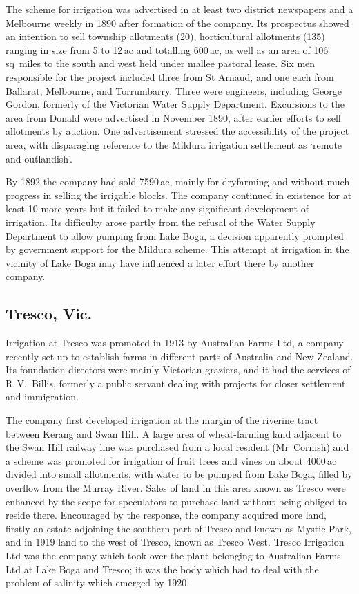 The scheme for irrigation was advertised in at least two district
newspapers and a Melbourne weekly in 1890 after formation of the
company.  Its prospectus showed an intention to sell township
allotments (20), horticultural allotments (135) ranging in size from 5
to 12\,ac and totalling 600\,ac, as well as an area of 106\,sq~miles
to the south and west held under mallee pastoral lease. Six men
responsible for the project included three from St Arnaud, and one
each from Ballarat, Melbourne, and Torrumbarry.  Three were engineers,
including George Gordon, formerly of the Victorian Water Supply
Department.  Excursions to the area from Donald were advertised in
November 1890, after earlier efforts to sell allotments by auction.
One advertisement stressed the accessibility of the project area, with
disparaging reference to the Mildura irrigation settlement as `remote
and outlandish'.

By 1892 the company had sold 7590\,ac, mainly for dryfarming and
without much progress in selling the irrigable blocks.  The company
continued in existence for at least 10 more years but it failed to
make any significant development of irrigation.  Its difficulty arose
partly from the refusal of the Water Supply Department to allow
pumping from Lake Boga, a decision apparently prompted by government
support for the Mildura scheme.  This attempt at irrigation in the
vicinity of Lake Boga may have influenced a later effort there by
another company.

\subsection*{Tresco, Vic.}

Irrigation at Tresco was promoted in 1913 by Australian Farms Ltd, a
company recently set up to establish farms in different parts of
Australia and New Zealand.  Its foundation directors were mainly
Victorian graziers, and it had the services of R.\,V.~Billis, formerly
a public servant dealing with projects for closer settlement and
immigration.

The company first developed irrigation at the margin of the riverine
tract between Kerang and Swan Hill.  A large area of wheat-farming
land adjacent to the Swan Hill railway line was purchased from a local
resident (Mr~Cornish) and a scheme was promoted for irrigation of
fruit trees and vines on about 4000\,ac divided into small allotments,
with water to be pumped from Lake Boga, filled by overflow from the
Murray River.  Sales of land in this area known as Tresco were
enhanced by the scope for speculators to purchase land without being
obliged to reside there.  Encouraged by the response, the company
acquired more land, firstly an estate adjoining the southern part of
Tresco and known as Mystic Park, and in 1919 land to the west of
Tresco, known as Tresco West.  Tresco Irrigation Ltd was the company
which took over the plant belonging to Australian Farms Ltd at Lake
Boga and Tresco; it was the body which had to deal with the problem of
salinity which emerged by 1920.

